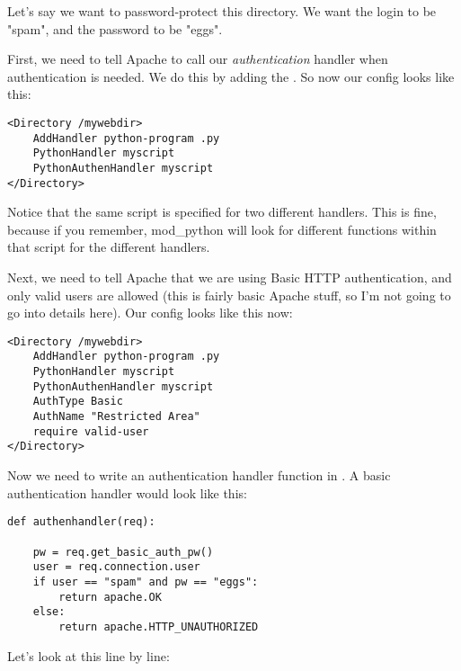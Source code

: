 Let's say we want to password-protect this directory. We want the
login to be "spam", and the password to be "eggs".

First, we need to tell Apache to call our \emph{authentication} handler when
authentication is needed. We do this by adding the
. So now our config looks like this:

\begin{verbatim}
<Directory /mywebdir>
    AddHandler python-program .py
    PythonHandler myscript
    PythonAuthenHandler myscript
</Directory>
\end{verbatim}

Notice that the same script is specified for two different
handlers. This is fine, because if you remember, mod_python will look
for different functions within that script for the different handlers.

Next, we need to tell Apache that we are using Basic HTTP
authentication, and only valid users are allowed (this is fairly basic
Apache stuff, so I'm not going to go into details here). Our config
looks like this now:

\begin{verbatim}
<Directory /mywebdir>
    AddHandler python-program .py
    PythonHandler myscript
    PythonAuthenHandler myscript
    AuthType Basic
    AuthName "Restricted Area"
    require valid-user
</Directory>
\end{verbatim}          

Now we need to write an authentication handler function in
. A basic authentication handler would look like this:

\begin{verbatim}
def authenhandler(req):

    pw = req.get_basic_auth_pw()
    user = req.connection.user     
    if user == "spam" and pw == "eggs":
        return apache.OK
    else:
        return apache.HTTP_UNAUTHORIZED
\end{verbatim}  

Let's look at this line by line: 


